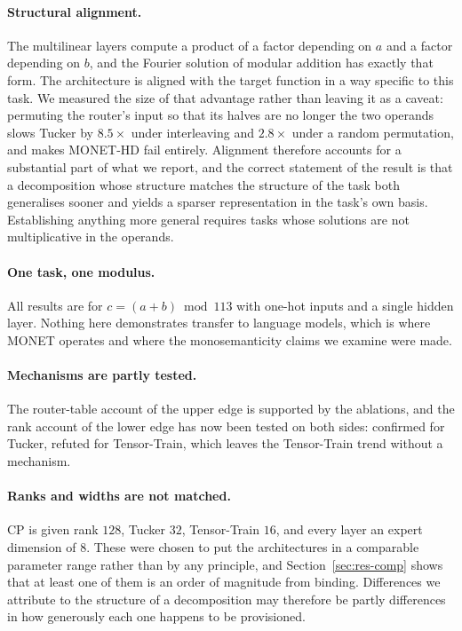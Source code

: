\paragraph{Structural alignment.} The multilinear layers compute a product of a
factor depending on $a$ and a factor depending on $b$, and the Fourier solution
of modular addition has exactly that form. The architecture is aligned with the
target function in a way specific to this task. We measured the size of that
advantage rather than leaving it as a caveat: permuting the router's input so
that its halves are no longer the two operands slows Tucker by $8.5\times$
under interleaving and $2.8\times$ under a random permutation, and makes
MONET-HD fail entirely. Alignment therefore accounts for a substantial part of
what we report, and the correct statement of the result is that a decomposition
whose structure matches the structure of the task both generalises sooner and
yields a sparser representation in the task's own basis. Establishing anything
more general requires tasks whose solutions are not multiplicative in the
operands.

\paragraph{One task, one modulus.} All results are for $c = (a+b) \bmod 113$
with one-hot inputs and a single hidden layer. Nothing here demonstrates
transfer to language models, which is where MONET operates and where the
monosemanticity claims we examine were made.

\paragraph{Mechanisms are partly tested.} The router-table account of the upper
edge is supported by the ablations, and the rank account of the lower edge has
now been tested on both sides: confirmed for Tucker, refuted for Tensor-Train,
which leaves the Tensor-Train trend without a mechanism.

\paragraph{Ranks and widths are not matched.} CP is given rank $128$, Tucker
$32$, Tensor-Train $16$, and every layer an expert dimension of $8$. These were
chosen to put the architectures in a comparable parameter range rather than by
any principle, and Section~\ref{sec:res-comp} shows that at least one of them
is an order of magnitude from binding. Differences we attribute to the
structure of a decomposition may therefore be partly differences in how
generously each one happens to be provisioned.

